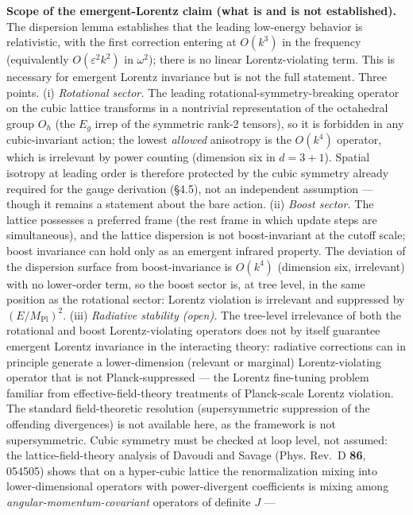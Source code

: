\documentclass[
]{article}
\begin{document}
\textbf{Scope of the emergent-Lorentz claim (what is and is not
established).} The dispersion lemma establishes that the leading
low-energy behavior is relativistic, with the first correction entering
at \(O(k^3)\) in the frequency (equivalently \(O(\varepsilon^2 k^2)\) in
\(\omega^2\)); there is no linear Lorentz-violating term. This is
necessary for emergent Lorentz invariance but is not the full statement.
Three points. (i) \emph{Rotational sector.} The leading
rotational-symmetry-breaking operator on the cubic lattice transforms in
a nontrivial representation of the octahedral group \(O_h\) (the \(E_g\)
irrep of the symmetric rank-2 tensors), so it is forbidden in any
cubic-invariant action; the lowest \emph{allowed} anisotropy is the
\(O(k^4)\) operator, which is irrelevant by power counting (dimension
six in \(d=3+1\)). Spatial isotropy at leading order is therefore
protected by the cubic symmetry already required for the gauge
derivation (§4.5), not an independent assumption --- though it remains a
statement about the bare action. (ii) \emph{Boost sector.} The lattice
possesses a preferred frame (the rest frame in which update steps are
simultaneous), and the lattice dispersion is not boost-invariant at the
cutoff scale; boost invariance can hold only as an emergent infrared
property. The deviation of the dispersion surface from boost-invariance
is \(O(k^4)\) (dimension six, irrelevant) with no lower-order term, so
the boost sector is, at tree level, in the same position as the
rotational sector: Lorentz violation is irrelevant and suppressed by
\((E/M_{\text{Pl}})^2\). (iii) \emph{Radiative stability (open).} The
tree-level irrelevance of both the rotational and boost
Lorentz-violating operators does not by itself guarantee emergent
Lorentz invariance in the interacting theory: radiative corrections can
in principle generate a lower-dimension (relevant or marginal)
Lorentz-violating operator that is not Planck-suppressed --- the Lorentz
fine-tuning problem familiar from effective-field-theory treatments of
Planck-scale Lorentz violation. The standard field-theoretic resolution
(supersymmetric suppression of the offending divergences) is not
available here, as the framework is not supersymmetric. Cubic symmetry
must be checked at loop level, not assumed: the lattice-field-theory
analysis of Davoudi and Savage (Phys. Rev.~D \textbf{86}, 054505) shows
that on a hyper-cubic lattice the renormalization mixing into
lower-dimensional operators with power-divergent coefficients is mixing
among \emph{angular-momentum-covariant} operators of definite \(J\) ---
\end{document}
